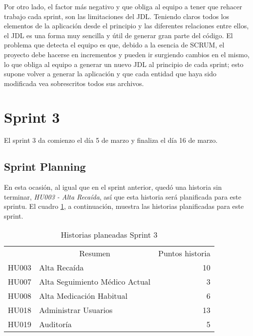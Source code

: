 Por otro lado, el factor más negativo y que obliga al equipo a tener que rehacer trabajo cada sprint, son las limitaciones del JDL. Teniendo claros todos los elementos de la aplicación desde el principio y las diferentes relaciones entre ellos, el JDL es una forma muy sencilla y útil de generar gran parte del código. El problema que detecta el equipo es que, debido a la esencia de SCRUM, el proyecto debe hacerse en incrementos y pueden ir surgiendo cambios en el mismo, lo que obliga al equipo a generar un nuevo JDL al principio de cada sprint; esto supone volver a generar la aplicación y que cada entidad que haya sido modificada vea sobrescritos todos sus archivos.
\clearpage
\section{Sprint 3}
\label{sec:sprint3}

El sprint 3 da comienzo el día 5 de marzo y finaliza el día 16 de marzo.

\subsection{Sprint Planning}
\label{subsec:S3-SP}

En esta ocasión, al igual que en el sprint anterior, quedó una historia sin terminar, \emph{HU003 - Alta Recaída}, así que esta historia será planificada para este sprintu. El cuadro \ref{historiasSprint3}, a continuación, muestra las historias planificadas para este sprint.
\begin{table}[!h]
\centering
\caption{Historias planeadas Sprint 3}
\label{historiasSprint3}
\begin{tabular}{llr}
\rowcolor[HTML]{C0C0C0} 
\multicolumn{1}{c}{\cellcolor[HTML]{C0C0C0}Identificador} & \multicolumn{1}{c}{\cellcolor[HTML]{C0C0C0}Resumen} & \multicolumn{1}{c}{\cellcolor[HTML]{C0C0C0}Puntos historia} \\
HU003                                                      & Alta Recaída                            			& 10                                                          \\
\rowcolor[HTML]{EFEFEF} 
HU007                                                      & Alta Seguimiento Médico Actual				       	& 3                                                           \\
HU008                                                      & Alta Medicación Habitual                    		& 6                                                           \\
\rowcolor[HTML]{EFEFEF} 
HU018                                                      & Administrar Usuarios                    			& 13                                                          
\\
HU019                                                      & Auditoría                         					& 5                                                          
\\
\end{tabular}
\end{table}

